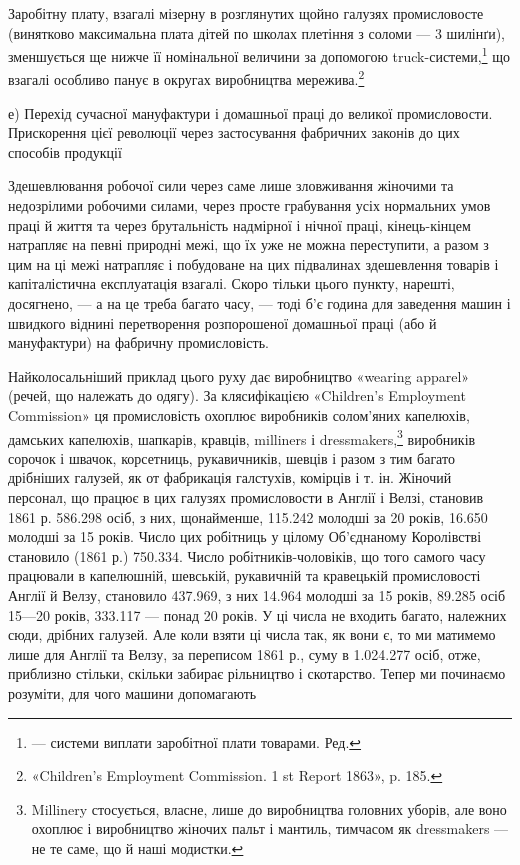 Заробітну плату, взагалі мізерну в розглянутих щойно галузях
промисловосте (винятково максимальна плата дітей по школах
плетіння з соломи — 3 шилінґи), зменшується ще нижче її номінальної
величини за допомогою truck-системи,\footnote*{
— системи виплати заробітної плати товарами. Ред.
} що взагалі
особливо панує в округах виробництва мережива.\footnote{
«Children’s Employment Commission. 1 st Report 1863», p. 185.
}

е) Перехід сучасної мануфактури і домашньої
праці до великої промисловости. Прискорення
цієї революції через застосування фабричних
законів до цих способів продукції

Здешевлювання робочої сили через саме лише зловживання
жіночими та недозрілими робочими силами, через просте грабування
усіх нормальних умов праці й життя та через брутальність
надмірної і нічної праці, кінець-кінцем натрапляє на певні природні
межі, що їх уже не можна переступити, а разом з цим
на ці межі натрапляє і побудоване на цих підвалинах здешевлення
товарів і капіталістична експлуатація взагалі. Скоро тільки цього
пункту, нарешті, досягнено, — а на це треба багато часу, — тоді
б’є година для заведення машин і швидкого віднині перетворення
розпорошеної домашньої праці (або й мануфактури) на фабричну
промисловість.

Найколосальніший приклад цього руху дає виробництво «wearing
apparel» (речей, що належать до одягу). За клясифікацією
«Children’s Employment Commission» ця промисловість охоплює
виробників солом’яних капелюхів, дамських капелюхів, шапкарів,
кравців, milliners і dressmakers,\footnote{
Millinery стосується, власне, лише до виробництва головних уборів,
але воно охоплює і виробництво жіночих пальт і мантиль, тимчасом
як dressmakers — не те саме, що й наші модистки.
} виробників сорочок і швачок,
корсетниць, рукавичників, шевців і разом з тим багато дрібніших
галузей, як от фабрикація галстухів, комірців і т. ін. Жіночий
персонал, що працює в цих галузях промисловости в Англії і
Велзі, становив 1861 р. 586.298 осіб, з них, щонайменше, 115.242
молодші за 20 років, 16.650 молодші за 15 років. Число цих робітниць
у цілому Об’єднаному Королівстві становило (1861 р.)
750.334. Число робітників-чоловіків, що того самого часу працювали
в капелюшній, шевській, рукавичній та кравецькій промисловості
Англії й Велзу, становило 437.969, з них 14.964 молодші
за 15 років, 89.285 осіб 15—20 років, 333.117 — понад 20 років.
У ці числа не входить багато, належних сюди, дрібних галузей.
Але коли взяти ці числа так, як вони є, то ми матимемо лише для
Англії та Велзу, за переписом 1861 р., суму в 1.024.277 осіб,
отже, приблизно стільки, скільки забирає рільництво і скотарство.
Тепер ми починаємо розуміти, для чого машини допомагають